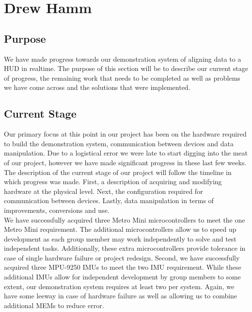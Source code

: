 \newpage 
\section{Drew Hamm}
\subsection{Purpose}
We have made progress towards our demonstration system of aligning data to a HUD in realtime.
The purpose of this section will be to describe our current stage of progress, the remaining work that needs to be completed as well as problems we have come across and the solutions that were implemented.\\

\subsection{Current Stage}
Our primary focus at this point in our project has been on the hardware required to build the demonstration system, communication between devices and data manipulation.
Due to a logistical error we were late to start digging into the meat of our project, however we have made significant progress in these last few weeks.
The description of the current stage of our project will follow the timeline in which progress was made.
First, a description of acquiring and modifying hardware at the physical level.
Next, the configuration required for communication between devices.
Lastly, data manipulation in terms of improvements, conversions and use.\\

We have successfully acquired three Metro Mini microcontrollers to meet the one Metro Mini requirement.
The additional microcontrollers allow us to speed up development as each group member may work independently to solve and test independent tasks.
Additionally, these extra microcontrollers provide tolerance in case of single hardware failure or project redesign.
Second, we have successfully acquired three MPU-9250 IMUs to meet the two IMU requirement.
While these additional IMUs allow for independent development by group members to some extent, our demonstration system requires at least two per system.
Again, we have some leeway in case of hardware failure as well as allowing us to combine additional MEMs to reduce error.\\

